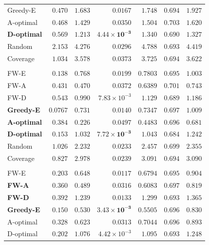 \documentclass[letterpaper, 9
 pt, conference]{ieeeconf}
\begin{document}
\begin{table}[ht]
\begin{tabular}{lrrrrrr}
Greedy-E & $0.470$ & $1.683$ & $0.0167$ & $1.748$ & $0.694$ & $1.927$ \\
A-optimal & $0.468$ & $1.429$ & $0.0350$ & $1.504$ & $0.703$ & $1.620$ \\
\textbf{D-optimal} & $0.569$ & $1.213$ & $\mathbf{4.44\!\times\!10^{-3}}$ & $1.340$ & $\mathbf{0.690}$ & $1.327$ \\
Random & $2.153$ & $4.276$ & $0.0296$ & $4.788$ & $0.693$ & $4.419$ \\
Coverage & $1.034$ & $3.578$ & $0.0373$ & $3.725$ & $0.694$ & $3.622$ \\
\addlinespace[1pt]
\multicolumn{7}{l}{\textit{$K{=}15$}} \\[1pt]
FW-E & $0.138$ & $0.768$ & $0.0199$ & $0.7803$ & $0.695$ & $1.003$ \\
FW-A & $0.431$ & $0.470$ & $0.0372$ & $0.6389$ & $0.701$ & $0.743$ \\
FW-D & $0.543$ & $0.990$ & $7.83\!\times\!10^{-3}$ & $1.129$ & $0.689$ & $1.186$ \\
\textbf{Greedy-E} & $\mathbf{0.0767}$ & $0.731$ & $0.0140$ & $0.7347$ & $0.697$ & $1.009$ \\
\textbf{A-optimal} & $0.384$ & $\mathbf{0.226}$ & $0.0497$ & $\mathbf{0.4483}$ & $0.696$ & $\mathbf{0.681}$ \\
\textbf{D-optimal} & $0.153$ & $1.032$ & $\mathbf{7.72\!\times\!10^{-3}}$ & $1.043$ & $\mathbf{0.684}$ & $1.242$ \\
Random & $1.026$ & $2.232$ & $0.0233$ & $2.457$ & $0.699$ & $2.355$ \\
Coverage & $0.827$ & $2.978$ & $0.0239$ & $3.091$ & $0.694$ & $3.090$ \\
\addlinespace[1pt]
\multicolumn{7}{l}{\textit{$K{=}20$}} \\[1pt]
FW-E & $0.203$ & $0.648$ & $0.0117$ & $0.6794$ & $0.695$ & $0.904$ \\
\textbf{FW-A} & $0.360$ & $\mathbf{0.489}$ & $0.0316$ & $0.6083$ & $0.697$ & $\mathbf{0.819}$ \\
\textbf{FW-D} & $0.392$ & $1.239$ & $0.0133$ & $1.299$ & $\mathbf{0.693}$ & $1.365$ \\
\textbf{Greedy-E} & $\mathbf{0.150}$ & $0.530$ & $\mathbf{3.43\!\times\!10^{-3}}$ & $\mathbf{0.5505}$ & $0.696$ & $0.830$ \\
A-optimal & $0.328$ & $0.623$ & $0.0313$ & $0.7044$ & $0.696$ & $0.893$ \\
D-optimal & $0.202$ & $1.076$ & $4.42\!\times\!10^{-3}$ & $1.095$ & $0.693$ & $1.248$ \\

\end{tabular}
\end{table}
\end{document}
